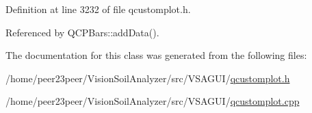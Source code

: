 Definition at line 3232 of file qcustomplot.\+h.



Referenced by Q\+C\+P\+Bars\+::add\+Data().



The documentation for this class was generated from the following files\+:\begin{DoxyCompactItemize}
\item 
/home/peer23peer/\+Vision\+Soil\+Analyzer/src/\+V\+S\+A\+G\+U\+I/\hyperlink{qcustomplot_8h}{qcustomplot.\+h}\item 
/home/peer23peer/\+Vision\+Soil\+Analyzer/src/\+V\+S\+A\+G\+U\+I/\hyperlink{qcustomplot_8cpp}{qcustomplot.\+cpp}\end{DoxyCompactItemize}
